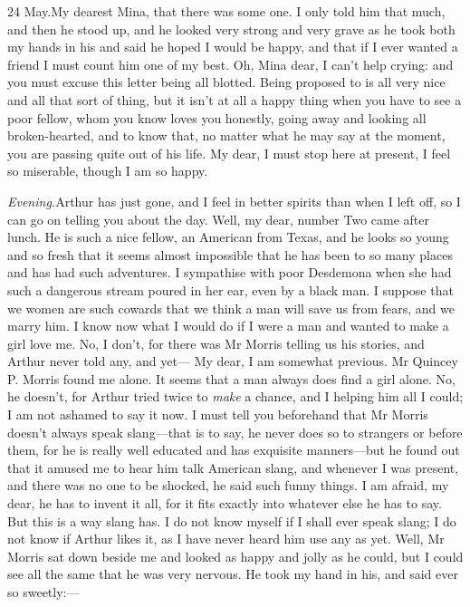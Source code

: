 \begin{mail}{24 May.}{My dearest Mina,}
that there was some one. I only told him that much, and then he stood up, and he looked very strong and very grave as he took both my hands in his and said he hoped I would be happy, and that if I ever wanted a friend I must count him one of my best. Oh, Mina dear, I can't help crying: and you must excuse this letter being all blotted. Being proposed to is all very nice and all that sort of thing, but it isn't at all a happy thing when you have to see a poor fellow, whom you know loves you honestly, going away and looking all broken-hearted, and to know that, no matter what he may say at the moment, you are passing quite out of his life. My dear, I must stop here at present, I feel so miserable, though I am so happy.


\noindent \textit{Evening.}\textemdash Arthur has just gone, and I feel in better spirits than when I left off, so I can go on telling you about the day. Well, my dear, number Two came after lunch. He is such a nice fellow, an American from Texas, and he looks so young and so fresh that it seems almost impossible that he has been to so many places and has had such adventures. I sympathise with poor Desdemona when she had such a dangerous stream poured in her ear, even by a black man. I suppose that we women are such cowards that we think a man will save us from fears, and we marry him. I know now what I would do if I were a man and wanted to make a girl love me. No, I don't, for there was Mr Morris telling us his stories, and Arthur never told any, and yet— My dear, I am somewhat previous. Mr Quincey P\@. Morris found me alone. It seems that a man always does find a girl alone. No, he doesn't, for Arthur tried twice to \textit{make} a chance, and I helping him all I could; I am not ashamed to say it now. I must tell you beforehand that Mr Morris doesn't always speak slang—that is to say, he never does so to strangers or before them, for he is really well educated and has exquisite manners—but he found out that it amused me to hear him talk American slang, and whenever I was present, and there was no one to be shocked, he said such funny things. I am afraid, my dear, he has to invent it all, for it fits exactly into whatever else he has to say. But this is a way slang has. I do not know myself if I shall ever speak slang; I do not know if Arthur likes it, as I have never heard him use any as yet. Well, Mr Morris sat down beside me and looked as happy and jolly as he could, but I could see all the same that he was very nervous. He took my hand in his, and said ever so sweetly:—


\end{mail}
